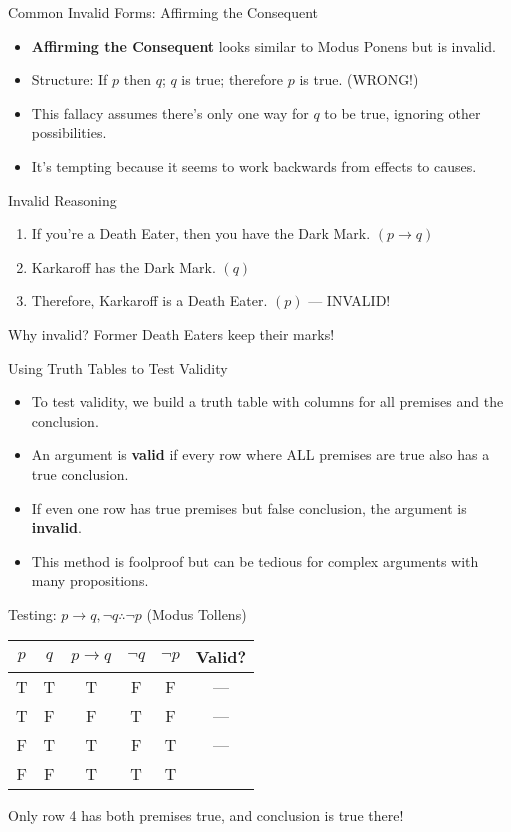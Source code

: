 \documentclass{beamer}
\begin{document}
	\begin{frame}{Common Invalid Forms: Affirming the Consequent}
		\begin{itemize}
			\item \textbf{Affirming the Consequent} looks similar to Modus Ponens but is invalid.
			\item Structure: If $p$ then $q$; $q$ is true; therefore $p$ is true. (WRONG!)
			\item This fallacy assumes there's only one way for $q$ to be true, ignoring other possibilities.
			\item It's tempting because it seems to work backwards from effects to causes.
		\end{itemize}
		
		\begin{alertblock}{Invalid Reasoning}
			\begin{enumerate}
				\item If you're a Death Eater, then you have the Dark Mark. $(p \rightarrow q)$
				\item Karkaroff has the Dark Mark. $(q)$
				\item Therefore, Karkaroff is a Death Eater. $(p)$ — INVALID!
			\end{enumerate}
			Why invalid? Former Death Eaters keep their marks!
		\end{alertblock}
	\end{frame}
	
	\begin{frame}{Using Truth Tables to Test Validity}
		\begin{itemize}
			\item To test validity, we build a truth table with columns for all premises and the conclusion.
			\item An argument is \textbf{valid} if every row where ALL premises are true also has a true conclusion.
			\item If even one row has true premises but false conclusion, the argument is \textbf{invalid}.
			\item This method is foolproof but can be tedious for complex arguments with many propositions.
		\end{itemize}
		
		\begin{example}
			Testing: $p \rightarrow q, \neg q \therefore \neg p$ (Modus Tollens)
			\begin{center}
				\begin{tabular}{|c|c|c|c|c|c|}
					\hline
					$p$ & $q$ & $p \rightarrow q$ & $\neg q$ & $\neg p$ & Valid? \\
					\hline
					T & T & T & F & F & — \\
					T & F & F & T & F & — \\
					F & T & T & F & T & — \\
					F & F & T & T & T & \checkmark \\
					\hline
				\end{tabular}
			\end{center}
			Only row 4 has both premises true, and conclusion is true there!
		\end{example}
	\end{frame}
	
\end{document}
